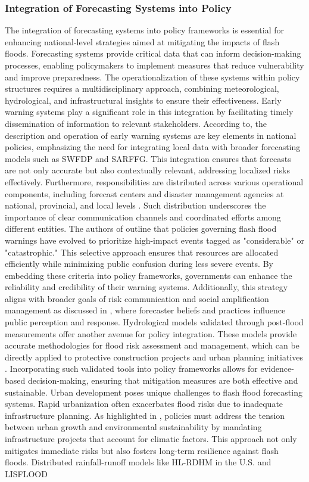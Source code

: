 \subsubsection{Integration of Forecasting Systems into Policy}
The integration of forecasting systems into policy frameworks is essential for enhancing national-level strategies aimed at mitigating the impacts of flash floods. Forecasting systems provide critical data that can inform decision-making processes, enabling policymakers to implement measures that reduce vulnerability and improve preparedness. The operationalization of these systems within policy structures requires a multidisciplinary approach, combining meteorological, hydrological, and infrastructural insights to ensure their effectiveness. Early warning systems play a significant role in this integration by facilitating timely dissemination of information to relevant stakeholders. According to, the description and operation of early warning systems are key elements in national policies, emphasizing the need for integrating local data with broader forecasting models such as SWFDP and SARFFG. This integration ensures that forecasts are not only accurate but also contextually relevant, addressing localized risks effectively. Furthermore, responsibilities are distributed across various operational components, including forecast centers and disaster management agencies at national, provincial, and local levels \citep{Jubach2016}. Such distribution underscores the importance of clear communication channels and coordinated efforts among different entities. The authors of outline that policies governing flash flood warnings have evolved to prioritize high-impact events tagged as "considerable" or "catastrophic." This selective approach ensures that resources are allocated efficiently while minimizing public confusion during less severe events. By embedding these criteria into policy frameworks, governments can enhance the reliability and credibility of their warning systems. Additionally, this strategy aligns with broader goals of risk communication and social amplification management as discussed in \citep{Henderson2020}, where forecaster beliefs and practices influence public perception and response. Hydrological models validated through post-flood measurements offer another avenue for policy integration. These models provide accurate methodologies for flood risk assessment and management, which can be directly applied to protective construction projects and urban planning initiatives \citep{Kastridis2020}. Incorporating such validated tools into policy frameworks allows for evidence-based decision-making, ensuring that mitigation measures are both effective and sustainable. Urban development poses unique challenges to flash flood forecasting systems. Rapid urbanization often exacerbates flood risks due to inadequate infrastructure planning. As highlighted in \citep{Saad2024}, policies must address the tension between urban growth and environmental sustainability by mandating infrastructure projects that account for climatic factors. This approach not only mitigates immediate risks but also fosters long-term resilience against flash floods. Distributed rainfall-runoff models like HL-RDHM in the U.S. and LISFLOOD 